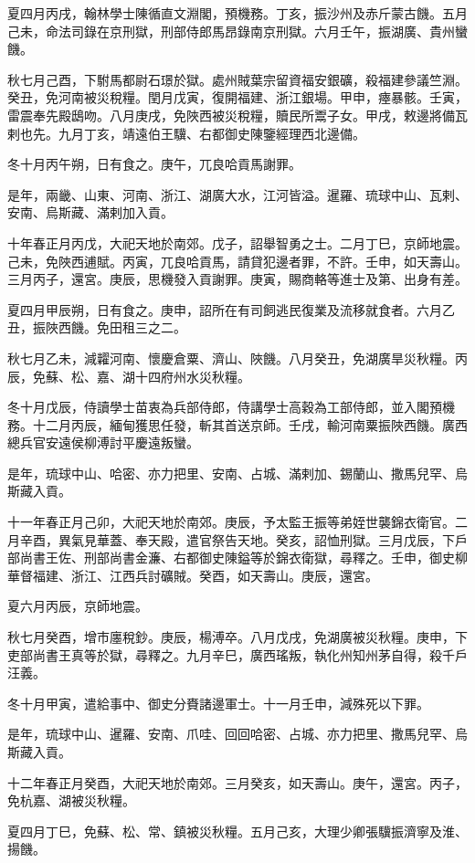 \begin{pinyinscope}
夏四月丙戌，翰林學士陳循直文淵閣，預機務。丁亥，振沙州及赤斤蒙古饑。五月己未，命法司錄在京刑獄，刑部侍郎馬昂錄南京刑獄。六月壬午，振湖廣、貴州蠻饑。

秋七月己酉，下駙馬都尉石璟於獄。處州賊葉宗留資福安銀礦，殺福建參議竺淵。癸丑，免河南被災稅糧。閏月戊寅，復開福建、浙江銀場。甲申，瘞暴骸。壬寅，雷震奉先殿鴟吻。八月庚戌，免陜西被災稅糧，贖民所鬻子女。甲戌，敕邊將備瓦剌也先。九月丁亥，靖遠伯王驥、右都御史陳鑒經理西北邊備。

冬十月丙午朔，日有食之。庚午，兀良哈貢馬謝罪。

是年，兩畿、山東、河南、浙江、湖廣大水，江河皆溢。暹羅、琉球中山、瓦剌、安南、烏斯藏、滿剌加入貢。

十年春正月丙戊，大祀天地於南郊。戊子，詔舉智勇之士。二月丁巳，京師地震。己未，免陜西逋賦。丙寅，兀良哈貢馬，請貸犯邊者罪，不許。壬申，如天壽山。三月丙子，還宮。庚辰，思機發入貢謝罪。庚寅，賜商輅等進士及第、出身有差。

夏四月甲辰朔，日有食之。庚申，詔所在有司飼逃民復業及流移就食者。六月乙丑，振陜西饑。免田租三之二。

秋七月乙未，減糶河南、懷慶倉粟、濟山、陜饑。八月癸丑，免湖廣旱災秋糧。丙辰，免蘇、松、嘉、湖十四府州水災秋糧。

冬十月戊辰，侍讀學士苗衷為兵部侍郎，侍講學士高穀為工部侍郎，並入閣預機務。十二月丙辰，緬甸獲思任發，斬其首送京師。壬戌，輸河南粟振陜西饑。廣西總兵官安遠侯柳溥討平慶遠叛蠻。

是年，琉球中山、哈密、亦力把里、安南、占城、滿剌加、錫蘭山、撒馬兒罕、烏斯藏入貢。

十一年春正月己卯，大祀天地於南郊。庚辰，予太監王振等弟姪世襲錦衣衛官。二月辛酉，異氣見華蓋、奉天殿，遣官祭告天地。癸亥，詔恤刑獄。三月戊辰，下戶部尚書王佐、刑部尚書金濂、右都御史陳鎰等於錦衣衛獄，尋釋之。壬申，御史柳華督福建、浙江、江西兵討礦賊。癸酉，如天壽山。庚辰，還宮。

夏六月丙辰，京師地震。

秋七月癸酉，增市廛稅鈔。庚辰，楊溥卒。八月戊戌，免湖廣被災秋糧。庚申，下吏部尚書王真等於獄，尋釋之。九月辛巳，廣西瑤叛，執化州知州茅自得，殺千戶汪義。

冬十月甲寅，遣給事中、御史分賚諸邊軍士。十一月壬申，減殊死以下罪。

是年，琉球中山、暹羅、安南、爪哇、回回哈密、占城、亦力把里、撒馬兒罕、烏斯藏入貢。

十二年春正月癸酉，大祀天地於南郊。三月癸亥，如天壽山。庚午，還宮。丙子，免杭嘉、湖被災秋糧。

夏四月丁巳，免蘇、松、常、鎮被災秋糧。五月己亥，大理少卿張驥振濟寧及淮、揚饑。


\end{pinyinscope}
